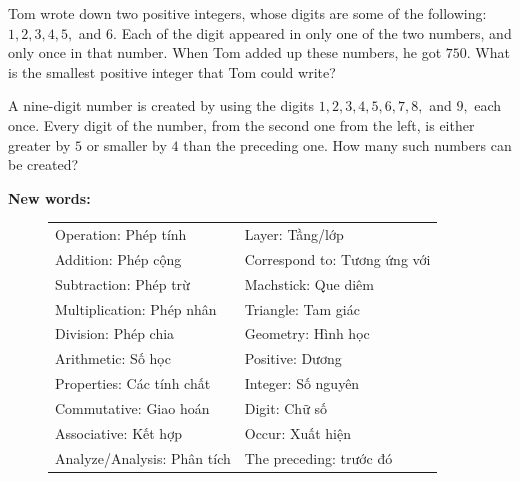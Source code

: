 \documentclass{article}
\begin{document}
\begin{exercise*}[Exercise 2]
    \label{example:pi-2022-3-e2}
    Tom wrote down two positive integers, whose digits are some of the following: $1, 2, 3, 4, 5,$ and $6.$ 
    Each of the digit appeared in only one of the two numbers, and only once in that number.
    When Tom added up these numbers, he got $750.$
    What is the smallest positive integer that Tom could write?
\end{exercise*}

\begin{exercise*}[Exercise 3]
    \label{example:pi-2022-3-e3}
    A nine-digit number is created by using the digits $1, 2, 3, 4, 5, 6, 7, 8,$ and $9,$ each once.
    Every digit of the number, from the second one from the left,
    is either greater by $5$ or smaller by $4$ than the preceding one.
    How many such numbers can be created? 
\end{exercise*}

\begin{otherlanguage}{vietnamese}

\textbf{New words:}
\begin{figure}[h]
    \begin{tabular}{ll}
        {\color[HTML]{B00004} Operation}: Phép tính      & {\color[HTML]{B00004} Layer}: Tầng/lớp     \\
        {\color[HTML]{B00004} Addition}: Phép cộng      & {\color[HTML]{B00004} Correspond to}: Tương ứng với \\
        {\color[HTML]{B00004} Subtraction}: Phép trừ     & {\color[HTML]{B00004} Machstick}: Que diêm \\
        {\color[HTML]{B00004} Multiplication}: Phép nhân & {\color[HTML]{B00004} Triangle}: Tam giác  \\
        {\color[HTML]{B00004} Division}: Phép chia       & {\color[HTML]{B00004} Geometry}: Hình học  \\
        {\color[HTML]{B00004} Arithmetic}: Số học        & {\color[HTML]{B00004} Positive}: Dương     \\
        {\color[HTML]{B00004} Properties}: Các tính chất & {\color[HTML]{B00004} Integer}: Số nguyên  \\
        {\color[HTML]{B00004} Commutative}: Giao hoán    & {\color[HTML]{B00004} Digit}: Chữ số       \\
        {\color[HTML]{B00004} Associative}: Kết hợp      & {\color[HTML]{B00004} Occur}: Xuất hiện    \\
        {\color[HTML]{B00004} Analyze/Analysis}: Phân tích & {\color[HTML]{B00004} The preceding}: trước đó     
    \end{tabular}
\end{figure}

\end{otherlanguage}
\end{document}
